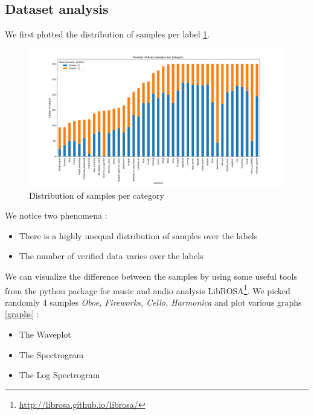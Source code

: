 \documentclass{article} %
\begin{document}
	\subsection{Dataset analysis}
		We first plotted the distribution of samples per label \ref{fig:category_distribution}.
		\begin{figure}
		  \includegraphics[width=\linewidth]{category_distribution.png}
		  \caption{Distribution of samples per category}
		  \label{fig:category_distribution}
		\end{figure}
		We notice two phenomena :
		\begin{itemize}
		    \item There is a highly unequal distribution of samples over the labels
		    \item The number of verified data varies over the labels
		\end{itemize}

		We can visualize the difference between the samples by using some useful tools from the python package for music and audio analysis LibROSA\footnote{\url{http://librosa.github.io/librosa/}}. We picked randomly 4 samples \emph{Oboe, Fireworks, Cello, Harmonica} and plot various graphs \ref{graphs} :

		\begin{itemize}
		    \item The Waveplot
		    \item The Spectrogram
		    \item The Log Spectrogram
		\end{itemize}
\end{document}
